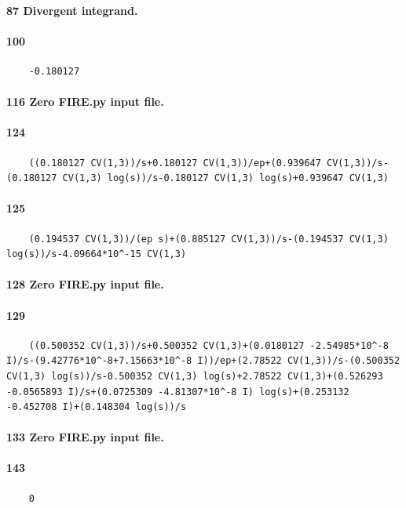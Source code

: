 \documentclass{article}
\newcommand{\WN}[1]{\textcolor{RawSienna}{#1}}
\newcommand{\WNZF}{\WN{Zero FIRE.py input file. }}
\newcommand{\WNDIV}{\WN{Divergent integrand. }}
\begin{document}
\paragraph{87	\WNDIV}
\paragraph{100}
\begin{verbatim}
	-0.180127
\end{verbatim}
\paragraph{116	\WNZF}
\paragraph{124}
\begin{verbatim}
	((0.180127 CV(1,3))/s+0.180127 CV(1,3))/ep+(0.939647 CV(1,3))/s-(0.180127 CV(1,3) log(s))/s-0.180127 CV(1,3) log(s)+0.939647 CV(1,3)
\end{verbatim}
\paragraph{125}
\begin{verbatim}
	(0.194537 CV(1,3))/(ep s)+(0.885127 CV(1,3))/s-(0.194537 CV(1,3) log(s))/s-4.09664*10^-15 CV(1,3)
\end{verbatim}
\paragraph{128	\WNZF}
\paragraph{129}
\begin{verbatim}
	((0.500352 CV(1,3))/s+0.500352 CV(1,3)+(0.0180127 -2.54985*10^-8 I)/s-(9.42776*10^-8+7.15663*10^-8 I))/ep+(2.78522 CV(1,3))/s-(0.500352 CV(1,3) log(s))/s-0.500352 CV(1,3) log(s)+2.78522 CV(1,3)+(0.526293 -0.0565893 I)/s+(0.0725309 -4.81307*10^-8 I) log(s)+(0.253132 -0.452708 I)+(0.148304 log(s))/s
\end{verbatim}
\paragraph{133	\WNZF}
\paragraph{143}
\begin{verbatim}
	0
\end{verbatim}
\end{document}
